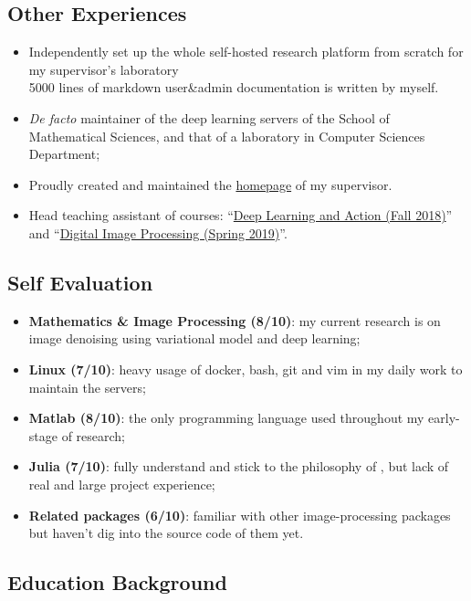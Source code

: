 \subsection*{Other Experiences}
  \begin{itemize}
      \item Independently set up the whole self-hosted research platform from scratch for my supervisor's laboratory\\
        {\small
        5000 lines of markdown user\&admin documentation is written by myself.
        }
      \item \textit{De facto} maintainer of the deep learning servers of the School of Mathematical Sciences, and that of a laboratory in Computer Sciences Department;
      \item Proudly created and maintained the \href{http://math.ecnu.edu.cn/~fli/}{homepage} of my supervisor.
      \item Head teaching assistant of courses: ``\href{http://math.ecnu.edu.cn/~fli/Teaching/DeepLearning/Fall2018/index.html}{Deep Learning and Action (Fall 2018)}''  and ``\href{http://math.ecnu.edu.cn/~fli/Teaching/DigitalImageProcessing/Spring2019/index.html}{Digital Image Processing (Spring 2019)}''.
  \end{itemize}


\subsection*{Self Evaluation}
\begin{itemize}
    \item \textbf{Mathematics \& Image Processing (8/10)}: my current research is on image denoising using variational model and deep learning;
    \item \textbf{Linux (7/10)}: heavy usage of docker, bash, git and vim in my daily work to maintain the servers;
    \item \textbf{Matlab (8/10)}: the only programming language used throughout my early-stage of research;
    \item \textbf{Julia (7/10)}: fully understand and stick to the philosophy of \langjulia, but lack of real and large project experience;
    \item \textbf{Related packages (6/10)}: familiar with other image-processing packages but haven't dig into the source code of them yet.
\end{itemize}

\subsection*{Education Background}

